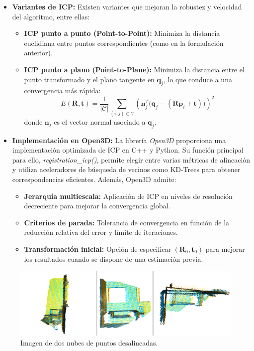 \documentclass[12pt, a4paper, twoside]{article}
\begin{document}
\begin{itemize}
\begin{itemize}
        \item \textbf{Variantes de ICP:} Existen variantes que mejoran la robustez y velocidad del algoritmo, entre ellas:
        \begin{itemize}
      \item \textbf{ICP punto a punto (Point-to-Point):} Minimiza la distancia euclidiana entre puntos correspondientes (como en la formulación anterior).
      \item \textbf{ICP punto a plano (Point-to-Plane):} Minimiza la distancia entre el punto transformado y el plano tangente en $\mathbf{q}_j$, lo que conduce a una 
      convergencia más rápida:
      \[
      E(\mathbf{R}, \mathbf{t}) =
      \frac{1}{|\mathcal{C}|} \sum_{(i,j) \in \mathcal{C}}
      \left( \mathbf{n}_j^{T} \big(\mathbf{q}_j - (\mathbf{R}\mathbf{p}_i + \mathbf{t}) \big) \right)^{2}
      \]
      donde $\mathbf{n}_j$ es el vector normal asociado a $\mathbf{q}_j$.
        \end{itemize}
        \item \textbf{Implementación en Open3D\cite{Zhou2018}:} La librería \textit{Open3D}\cite{Zhou2018} proporciona una implementación optimizada de ICP en C++\cite{cpp} y Python\cite{python}. Su función principal para ello,
        \textit{registration\_icp()}, permite elegir entre varias métricas de alineación y utiliza aceleradores de búsqueda de vecinos como KD-Trees para obtener correspondencias eficientes.
        Además, Open3D\cite{Zhou2018} admite:
        \begin{itemize}
        \item \textbf{Jerarquía multiescala:} Aplicación de ICP en niveles de resolución decreciente para mejorar la convergencia global.
        \item \textbf{Criterios de parada:} Tolerancia de convergencia en función de la reducción relativa del error y límite de iteraciones.
        \item \textbf{Transformación inicial:} Opción de especificar $(\mathbf{R}_0, \mathbf{t}_0)$ para mejorar los resultados cuando se dispone de una estimación previa.
        \end{itemize}
      \end{itemize}

      \begin{figure}[h]
        \centering
      \includegraphics[width=1\textwidth]{misaligned_frames.png}
        \caption{Imagen de dos nubes de puntos desalineadas.}
      \end{figure}


\end{itemize}
\end{document}
